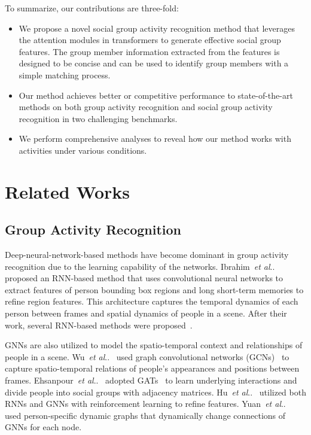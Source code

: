 \documentclass[runningheads]{llncs}
\makeatletter
\DeclareRobustCommand\onedot{\futurelet\@let@token\@onedot}
\def\@onedot{\ifx\@let@token.\else.\null\fi\xspace}
\def\etal{\emph{et al}\onedot}
\makeatother
\begin{document}
To summarize, our contributions are three-fold:
\begin{itemize}
\item We propose a novel social group activity recognition method that leverages the attention modules in transformers to generate effective social group features. The group member information extracted from the features is designed to be concise and can be used to identify group members with a simple matching process.
\item Our method achieves better or competitive performance to state-of-the-art methods on both group activity recognition and social group activity recognition in two challenging benchmarks.
\item We perform comprehensive analyses to reveal how our method works with activities under various conditions.
\end{itemize}

\section{Related Works}

\subsection{Group Activity Recognition}
Deep-neural-network-based methods have become dominant in group activity recognition due to the learning capability of the networks.
Ibrahim~\etal~\cite{ibrahim_cvpr2016} proposed an RNN-based method that uses convolutional neural networks to extract features of person bounding box regions and long short-term memories to refine region features. This architecture captures the temporal dynamics of each person between frames and spatial dynamics of people in a scene. After their work, several RNN-based methods were proposed~\cite{shu_cvpr2017,bagautdinov_cvpr2017,wang_cvpr2017,kong_icassp2018,qi_eccv2018}.

GNNs are also utilized to model the spatio-temporal context and relationships of people in a scene.
Wu~\etal~\cite{wu_cvpr2019} used graph convolutional networks (GCNs)~\cite{kipf_iclr2017} to capture spatio-temporal relations of people's appearances and positions between frames.
Ehsanpour~\etal~\cite{ehsanpour_eccv2020} adopted GATs~\cite{velickovic_iclr2018} to learn underlying interactions and divide people into social groups with adjacency matrices.
Hu~\etal~\cite{hu_cvpr2020} utilized both RNNs and GNNs with reinforcement learning to refine features.
Yuan~\etal~\cite{yuan_iccv2021} used person-specific dynamic graphs that dynamically change connections of GNNs for each node.
\end{document}
